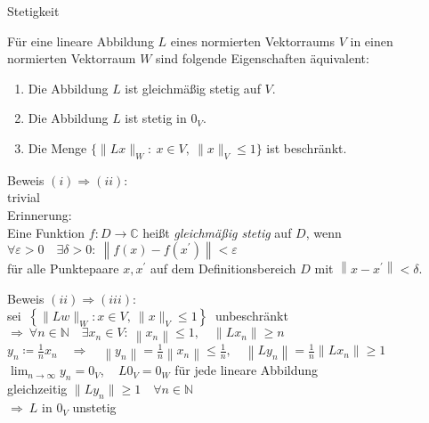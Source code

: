 \documentclass[AERbeamer%
,handout%
,optBeamerClassicFormat%
,optLeftEquations   %
]{AERlatex}
\begin{document}
%
    \begin{frame}{Stetigkeit}
        \begin{Satz}
            Für eine lineare Abbildung $L$ eines normierten Vektorraums $V$ in einen normierten Vektorraum $W$ sind folgende Eigenschaften äquivalent:
            \begin{enumerate}
                [label=$(\roman*)$, leftmargin=2em]
                \item Die Abbildung $L$ ist gleichmäßig stetig auf $V$.
                \item Die Abbildung $L$ ist stetig in $0_V$.
                \item Die Menge $\{\|Lx\|_W: ~ x \in V, ~ \|x\|_V \leq 1\}$ ist beschränkt.
            \end{enumerate}
        \end{Satz}
    \end{frame}
%
    \begin{frame}{Beweis}
        \setlength{\baselineskip}{1.6\baselineskip}
%
        $(i) \Rightarrow (ii)$:\\ \pause
        trivial \\ \pause
        \vspace{1em}
        Erinnerung: \\
        Eine Funktion $f: D \rightarrow \mathbb{C}$ heißt \emph{gleichmäßig stetig} auf $D$, wenn \\
        $\forall \varepsilon>0 \quad \exists \delta>0: ~ \left\|f(x)-f\left(x^{\prime}\right)\right\|<\varepsilon$ \\
        für alle Punktepaare $x, x^{\prime}$ auf dem Definitionsbereich $D$ mit $\left\|x-x^{\prime}\right\|<\delta$.
    \end{frame}
%
    \begin{frame}{Beweis}
        \setlength{\baselineskip}{1.6\baselineskip}
%
        $(ii) \Rightarrow (iii)$: \\ \pause
        sei $ ~\left\{\|L w\|_W: x \in V, ~ \|x \|_V \leq 1\right\} ~$ unbeschränkt \\ \pause
        $\Rightarrow ~ \forall n \in \mathbb{N} \quad \exists x_n \in V: ~ \left\|x_n\right\| \leq 1, \quad \left\|L x_n\right\| \geq n$ \\ \pause
        $y_n \coloneqq \frac{1}{n} x_n \quad \Rightarrow \quad \left\|y_n\right\|=\frac{1}{n}\left\|x_n\right\| \leq \frac{1}{n}, \quad \left\|L y_n\right\|=\frac{1}{n}\left\|L x_n\right\| \geq 1$ \\ \pause
        $\lim _{n \rightarrow \infty} y_n=0_V$, ~ $L 0_V=0_W$ für jede lineare Abbildung \\ \pause
        gleichzeitig $\|Ly_n\| \geq 1 \quad \forall n \in \mathbb{N}$ \\ \pause
        $\Rightarrow ~ L$ in $0_V$ unstetig
    \end{frame}
\end{document}
